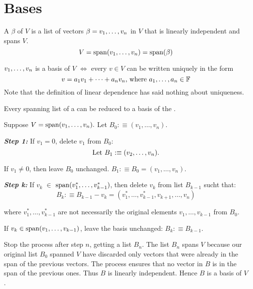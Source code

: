 \section{Bases}


\setcounter{thm}{25}
\begin{mydef} [basis]
  A  $\beta$ of $V$ is a list of vectors $\beta = v_1, \dots, v_n$ in $V$ that is linearly independent and spans $V$.
  \begin{equation}
    V = \operatorname{span} (v_1, \dots, v_n) = \operatorname{span} ( \beta )
  \end{equation}
\end{mydef}

\setcounter{thm}{27}
\begin{thm} 
  $v_1, \dots, v_n$ is a basis of $V$ $\iff$ every $v \in V$ can be written uniquely in the form
  \begin{equation}
    v=a_1 v_1 + \dots + a_n v_n $, where $ a_1, \dots, a_n \in \myF
  \end{equation}
  Note that the definition of linear dependence has said nothing about uniqueness.
\end{thm}

\setcounter{thm}{29}
\begin{thm}  
  \label{thm: every spanning list contains a basis}
  Every spanning list of a \vs can be reduced to a basis of the \vs.
\end{thm}
\begin{prf}
  Suppose $V=\operatorname{span} (v_1, \ldots, v_n).$ Let $B_0 :\equiv (v_1, \ldots, v_n)$.
  
  \emph{\bfseries Step 1: } If $v_1 = 0$, delete $v_1$ from $B_0$: 
  \begin{equation}
    $Let $B_1 :\equiv (v_2, \ldots, v_n).
  \end{equation} 
  
  If $v_1 \neq 0$, then leave $B_0$ unchanged. $B_1 :\equiv B_0=(v_1, \ldots, v_n)$.
  
  \emph{\bfseries Step k: } If $v_k$ $\in$ $\operatorname{span} (v_1^*, \ldots, v_{k-1}^*)$, then delete $v_k$ from list $B_{k-1}$ sucht that:
  \begin{equation}
    B_k :\equiv B_{k-1} - v_k = (v_{1}^*, \ldots, v_{k-1}^*, v_{k+1}, \ldots, v_n)
  \end{equation} 
  
  where $v_1^*, \ldots, v_{k-1}^*$ are not necessarily the original elements $v_1, \ldots, v_{k-1}$ from $B_0$.
  
  If $v_k \in \operatorname{span} (v_1, \ldots, v_{k-1})$, leave the basis unchanged: $B_k :\equiv B_{k-1}$.
  
  Stop the process after step $n$, getting a list $B_n$. The list $B_n$ spans $V$ because our original list $B_0$ spanned $V$  have discarded only vectors that were already in the span of the previous vectors. The process ensures that no vector in $B$ is in the span of the previous ones. Thus $B$ is linearly independent. Hence $B$ is a basis of $V$.
\end{prf}

